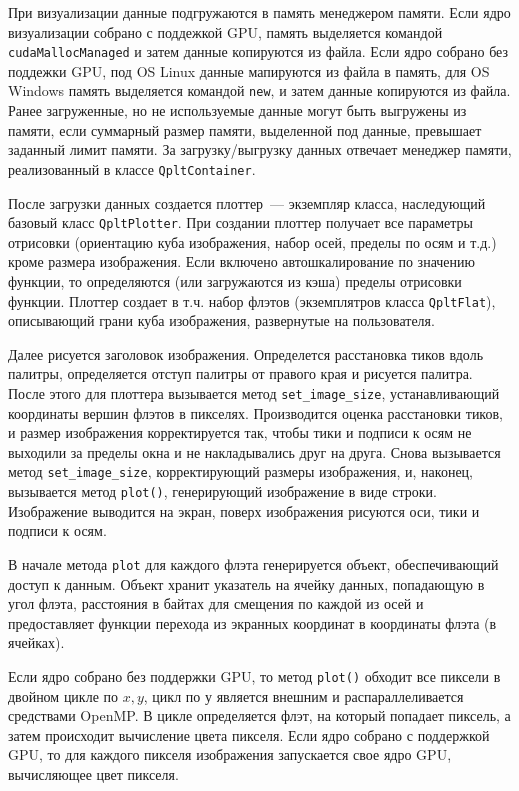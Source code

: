 \documentclass[12pt]{article}
\begin{document}
При визуализации данные подгружаются в память менеджером памяти. Если ядро визуализации собрано с поддежкой GPU,
память выделяется командой \verb'cudaMallocManaged' и затем данные копируются из файла. Если ядро собрано без поддежки GPU,
под OS Linux данные мапируются из файла в память, для OS Windows память выделяется командой \verb'new', и затем данные копируются из файла.
Ранее загруженные, но не используемые данные могут быть выгружены из памяти, если суммарный размер памяти, выделенной под данные, превышает заданный лимит памяти.
За загрузку/выгрузку данных отвечает менеджер памяти, реализованный в классе \verb'QpltContainer'.

После загрузки данных создается плоттер~--- экземпляр класса, наследующий базовый класс \verb'QpltPlotter'.
При создании плоттер  получает все параметры отрисовки (ориентацию куба изображения, набор осей, пределы по осям и т.д.) кроме размера изображения.
Если включено автошкалирование по значению функции, то определяются (или загружаются из кэша) пределы отрисовки функции.
Плоттер создает в т.ч. набор флэтов (экземплятров класса \verb'QpltFlat'), описывающий
грани куба изображения, развернутые на пользователя.

Далее рисуется заголовок изображения. Определется расстановка тиков вдоль палитры, определяется отступ палитры от правого края и рисуется палитра.
После этого для плоттера вызывается метод \verb'set_image_size', устанавливающий координаты вершин флэтов в пикселях.
Производится оценка расстановки тиков, и размер изображения корректируется так, чтобы тики и подписи к осям не выходили
за пределы окна и не накладывались друг на друга. Снова вызывается метод \verb'set_image_size', корректирующий размеры
изображения, и, наконец, вызывается метод \verb'plot()', генерирующий изображение в виде строки. Изображение выводится на экран,
поверх изображения рисуются оси, тики и подписи к осям.

В начале метода \verb'plot' для каждого флэта генерируется объект, обеспечивающий доступ к данным. Объект хранит указатель на ячейку данных, попадающую в угол флэта,
расстояния в байтах для смещения по каждой из осей и предоставляет функции перехода из экранных координат в координаты флэта (в ячейках).

Если ядро собрано без поддержки GPU, то метод \verb'plot()' обходит все пиксели в двойном цикле по $x, y$, цикл по $у$
является внешним и распараллеливается средствами OpenMP. В цикле определяется флэт, на который попадает пиксель, а затем происходит вычисление цвета пикселя.
Если ядро собрано  с поддержкой GPU, то для каждого пикселя изображения запускается свое ядро GPU, вычисляющее цвет пикселя.
\end{document}

